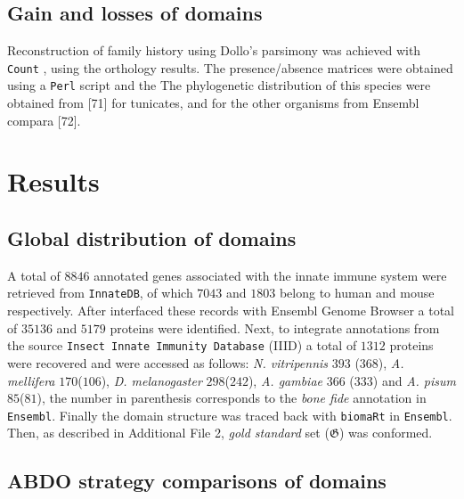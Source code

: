\documentclass[11pt]{article}
\newcommand{\TODO}[1]{\begingroup\color{red}#1\endgroup}
\begin{document}
\subsection*{Gain and losses of domains}

Reconstruction of family history using Dollo's parsimony was achieved with \texttt{Count} \cite{csuros2010}, using the orthology results. The presence/absence matrices were obtained using
a \texttt{Perl} script and the The phylogenetic distribution of this species 
were obtained from \TODO{[71]} for tunicates, and for the other organisms from 
Ensembl compara \TODO{[72]}.

\section*{Results}

\subsection*{Global distribution of domains}

A total of $8846$ annotated genes associated with the innate immune system were retrieved 
from \texttt{InnateDB}, of which $7043$ and $1803$ belong to human and mouse 
respectively. After interfaced these records with Ensembl Genome Browser a total 
of $35136$ and $5179$ proteins were identified. Next, to integrate annotations from
the source \texttt{Insect Innate Immunity Database} (IIID) a total of $1312$ proteins were
recovered and were accessed as follows: \textsl{N. vitripennis} $393$ ($368$), 
\textsl{A. mellifera} $170$($106$), \textsl{D. melanogaster} $298$($242$), \textsl{A. gambiae}
$366$ ($333$) and \textsl{A. pisum} $85$($81$), the number in parenthesis corresponds to 
the \textsl{bone fide} annotation in \texttt{Ensembl}. Finally the domain structure was 
traced back with \texttt{biomaRt} in \texttt{Ensembl}. Then, as described in Additional 
File 2, \textsl{gold standard} set ($\boldsymbol{\mathfrak{G}}$) was conformed.

\subsection*{\textbf{ABDO} strategy comparisons of domains} \label{subODB}
\end{document}
